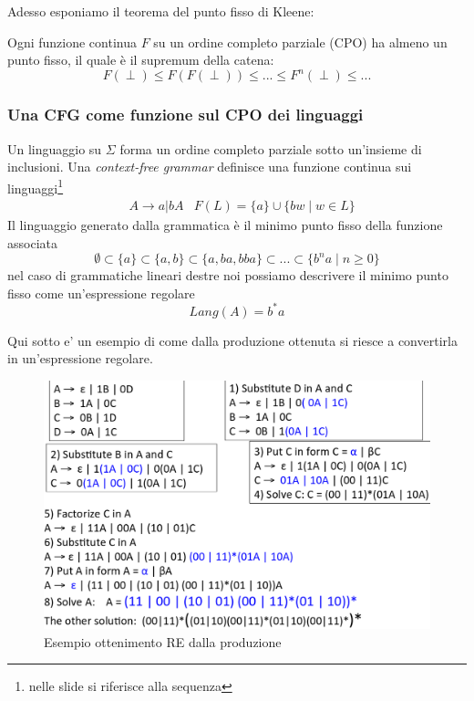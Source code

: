 Adesso esponiamo il teorema del punto fisso di Kleene:
\begin{definition}
Ogni funzione continua $F$ su un ordine completo parziale (CPO) ha almeno un
punto fisso, il quale \`e il supremum della catena:
$$F(\perp) \leq F(F(\perp)) \leq ... \leq F^n(\perp) \leq ...$$
\end{definition}

\subsubsection{Una CFG come funzione sul CPO dei linguaggi}
Un linguaggio su $\Sigma$ forma un ordine completo parziale sotto un'insieme di
inclusioni. Una \textit{context-free grammar} definisce una funzione continua
sui linguaggi\footnote{nelle slide si riferisce alla sequenza}
\begin{align*}
&A \to a | bA & F(L)=\{a\} \cup \{bw \mid w \in L\}
\end{align*}
Il linguaggio generato dalla grammatica \`e il minimo punto fisso della funzione
associata
$$
\emptyset \subset \{a\} \subset \{a,b\} \subset \{a,ba,bba\} \subset ...
\subset \{b^na \mid n \geq 0\}
$$
nel caso di grammatiche lineari destre noi possiamo descrivere il minimo punto
fisso come un'espressione regolare
$$Lang(A)=b^*a$$

Qui sotto e' un esempio di come dalla produzione ottenuta si riesce a
convertirla in un'espressione regolare.

\begin{figure}[H]
  \includegraphics[scale=0.5]{res/image/example_p_re}
  \caption{Esempio ottenimento RE dalla produzione}
  \label{img:example_p_re}
\end{figure}


